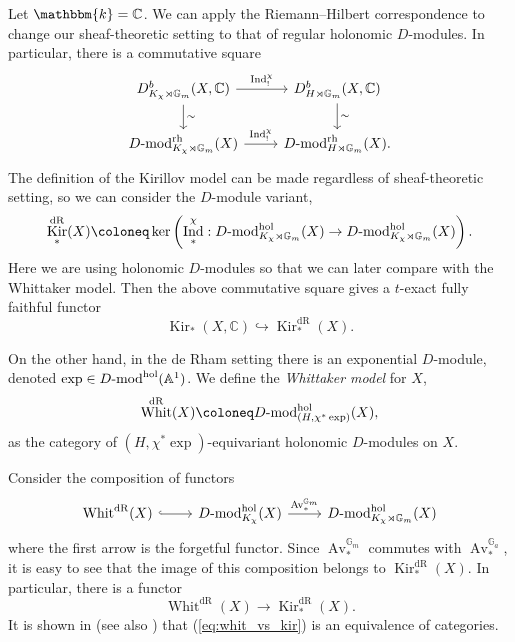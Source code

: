 \documentclass{amsart}
\newcommand{\C}{\mathbb{C}}
\newcommand{\A}{\mathbb{A}}
\newcommand{\G}{\mathbb{G}}
\renewcommand{\k}{\mathbbm{k}}
\DeclareMathOperator{\dR}{dR}
\newcommand{\Dmod}{D\textnormal{-mod}}
\newcommand{\rh}{\textnormal{rh}}
\newcommand{\hol}{\textnormal{hol}}
\DeclareMathOperator{\Ind}{Ind}
\DeclareMathOperator{\Av}{Av}
\DeclareMathOperator{\Kir}{Kir}
\DeclareMathOperator{\Whit}{Whit}
\theoremstyle{definition}
\begin{document}
Let $\k = \C$. We can apply the Riemann--Hilbert correspondence to change our sheaf-theoretic setting to that of regular holonomic $D$-modules.
    In particular, there is a commutative square
        \[\begin{tikzcd}
{D_{K_{\chi} \rtimes \G_m}^b (X, \C)} \arrow[d, "\sim"] \arrow[r, "\Ind_!^{\chi}"] & {D_{H \rtimes \G_m}^b (X, \C)} \arrow[d, "\sim"] \\
\Dmod_{K_{\chi} \rtimes \G_m}^{\rh} (X) \arrow[r, "\Ind_!^{\chi}"]                  & \Dmod_{H \rtimes \G_m}^{\rh} (X).                 
\end{tikzcd}\]
    The definition of the Kirillov model can be made regardless of sheaf-theoretic setting, so we can consider the $D$-module variant,
    \[\Kir_*^{\dR} (X) \coloneq \ker \left(  \Ind_*^{\chi} : \Dmod_{K_{\chi} \rtimes \G_m}^{\hol} (X) \to \Dmod_{K_{\chi} \rtimes \G_m}^{\hol} (X)\right).\]
    Here we are using holonomic $D$-modules so that we can later compare with the Whittaker model.  
    Then the above commutative square gives a $t$-exact fully faithful functor
    \begin{equation}\label{eq:kir_and_deRham}
        \Kir_* (X, \C) \hookrightarrow \Kir_*^{\dR} (X).
    \end{equation}

    On the other hand, in the de Rham setting there is an exponential $D$-module, denoted $\exp \in \Dmod^{\hol} (\A^1)$. 
    We define the \emph{Whittaker model} for $X$,
    \[\Whit^{\dR} (X) \coloneq \Dmod_{(H, \chi^* \exp) }^{\hol} (X),\]
    as the category of $(H, \chi^* \exp)$-equivariant holonomic $D$-modules on $X$. 

    Consider the composition of functors
    \[\begin{tikzcd}
\Whit^{\dR} (X) \arrow[r, hook] & \Dmod_{K_{\chi} }^{\hol} (X) \arrow[r, "\Av_*^{\G_m}"] & \Dmod_{K_{\chi} \rtimes \G_m }^{\hol} (X)
\end{tikzcd}\]
    where the first arrow is the forgetful functor. Since $\Av_*^{\G_m}$ commutes with $\Av_*^{\G_a}$, it is easy to see that the image of this composition belongs to $\Kir_*^{\dR} (X)$.
    In particular, there is a functor
    \begin{equation}\label{eq:whit_vs_kir}
        \Whit^{\dR} (X) \to \Kir_*^{\dR} (X).
    \end{equation}
    It is shown in \cite[\S 1.6.3]{GaiWhit} (see also \cite[Proposition A.3.2]{GL}) that (\ref{eq:whit_vs_kir}) is an equivalence of categories.
\end{document}
